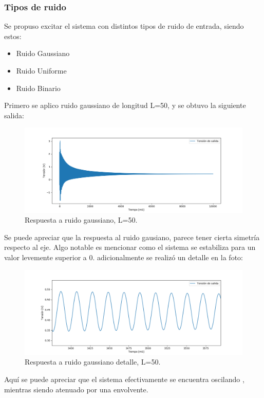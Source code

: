 \subsubsection{Tipos de ruido}
Se propuso excitar el sistema con distintos tipos de ruido de entrada, siendo estos:
\begin{itemize}
\item Ruido Gaussiano
\item Ruido Uniforme
\item Ruido Binario
\end{itemize}
Primero se aplico ruido gaussiano de longitud L=50, y se obtuvo la siguiente salida:
\begin{figure}[H]
	\centering
	\includegraphics[width=\textwidth]{ImagenesEjercicio4/gaussianResponse.PNG}
\caption{Respuesta a ruido gaussiano, L=50.}
	\label{fig:gaussiano}
\end{figure}
Se puede apreciar que la respuesta al ruido gausiano, parece tener cierta simetría respecto al eje.
Algo notable es mencionar como el sistema se estabiliza para un valor levemente superior a 0. 
adicionalmente se realizó un detalle en la foto:
\begin{figure}[H]
	\centering
	\includegraphics[width=\textwidth]{ImagenesEjercicio4/gaussianResponseDETAIL.PNG}
\caption{Respuesta a ruido gaussiano detalle, L=50.}
	\label{fig:gaussianod}
\end{figure}
Aquí se puede apreciar que el sistema efectivamente se encuentra oscilando , mientras siendo atenuado por una envolvente.\\
